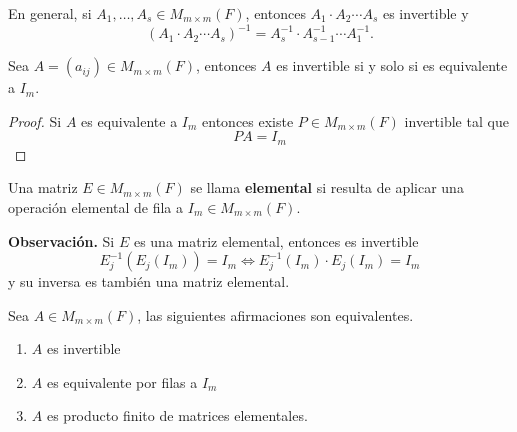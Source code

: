 \documentclass[12pt,a4paper]{book}
\begin{document}
    En general, si $A_{1},\dots,A_{s}\in M_{m\times m}(F)$, entonces $A_{1}\cdot A_{2}\cdots A_{s}$
    es invertible y
    \begin{equation*}
        (A_{1}\cdot A_{2}\cdots A_{s})^{-1}=A_{s}^{-1}\cdot A_{s-1}^{-1}\cdots A_{1}^{-1}.
    \end{equation*}

    \begin{proposicion}
        Sea $A=(a_{ij})\in M_{m\times m}(F)$, entonces $A$ es invertible si y solo si es
        equivalente a $I_{m}$.
    \end{proposicion}

    \begin{proof}
        Si $A$ es equivalente a $I_{m}$ entonces existe $P\in M_{m\times m}(F)$ invertible tal que
        \begin{equation*}
            PA=I_{m}
        \end{equation*}
    \end{proof}

    \begin{definicion}
        Una matriz $E\in M_{m\times m}(F)$ se llama \textbf{elemental} si resulta de aplicar una
        operación elemental de fila a $I_{m}\in M_{m\times m}(F)$.
    \end{definicion}

    \textbf{Observación.} Si $E$ es una matriz elemental, entonces es invertible
    \begin{equation*}
        E_{j}^{-1}(E_{j}(I_{m}))=I_{m}\Longleftrightarrow E_{j}^{-1}(I_{m})\cdot E_{j}(I_{m})=I_{m}
    \end{equation*}
    y su inversa es también una matriz elemental.

    \begin{teorema}
        Sea $A\in M_{m\times m}(F)$, las siguientes afirmaciones son equivalentes.
        \begin{enumerate}
            \item[$(i)$] $A$ es invertible
            \item[$(ii)$] $A$ es equivalente por filas a $I_{m}$
            \item[$(iii)$] $A$ es producto finito de matrices elementales.  
        \end{enumerate}
    \end{teorema}
\end{document}
